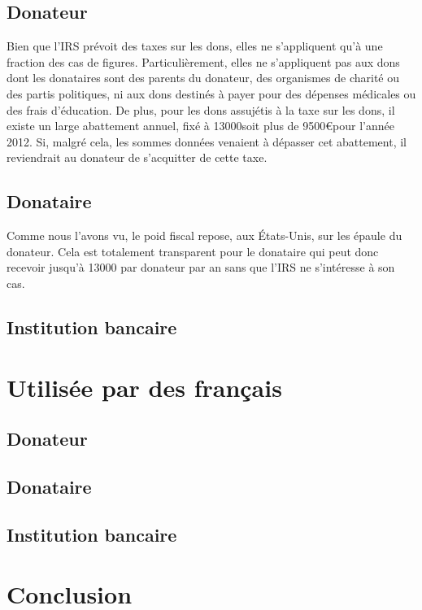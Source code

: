         \subsection{Donateur}
            Bien que l'IRS prévoit des taxes sur les dons, elles ne
            s'appliquent qu'à une fraction des cas de figures.
            Particulièrement, elles ne s'appliquent pas aux dons dont les
            donataires sont des parents du donateur, des organismes de
            charité ou des partis politiques, ni aux dons destinés à payer
            pour des dépenses médicales ou des frais d'éducation.
            De plus, pour les dons assujétis à la taxe sur les dons, il
            existe un large abattement annuel, fixé à 13000\dollar soit plus
            de 9500\euro pour l'année 2012. Si, malgré cela, les sommes
            données venaient à dépasser cet abattement, il reviendrait au
            donateur de s'acquitter de cette taxe.
        \subsection{Donataire}
            Comme nous l'avons vu, le poid fiscal repose, aux États-Unis, 
            sur les épaule du donateur. Cela est totalement transparent
            pour le donataire qui peut donc recevoir jusqu'à 13000\dollar
            par donateur par an sans que l'IRS ne s'intéresse à son cas.
        \subsection{Institution bancaire}
    \section{Utilisée par des français}
        \subsection{Donateur}
        \subsection{Donataire}
        \subsection{Institution bancaire}
    \section{Conclusion}
